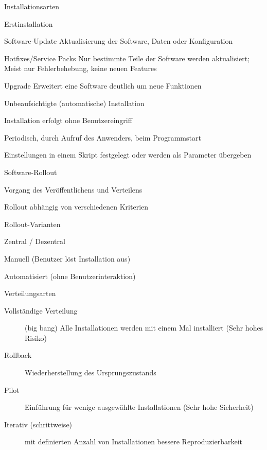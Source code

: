 \documentclass[a4paper]{article}
\begin{document}
\begin{multicols}{3}
  Installationsarten
  \begin{description*}
    \item[Erstinstallation]
    \item[Software-Update] Aktualisierung der Software, Daten oder Konfiguration
    \item[Hotfixes/Service Packs] Nur bestimmte Teile der Software werden aktualisiert; Meist nur Fehlerbehebung, keine neuen Features
    \item[Upgrade] Erweitert eine Software deutlich um neue Funktionen
    \item[Unbeaufsichtigte (automatische)] Installation
    \begin{itemize*}
      \item Installation erfolgt ohne Benutzereingriff
      \item Periodisch, durch Aufruf des Anwenders, beim Programmstart
      \item Einstellungen in einem Skript festgelegt oder werden als Parameter übergeben
    \end{itemize*}
  \end{description*}

  Software-Rollout
  \begin{itemize*}
    \item Vorgang des Veröffentlichens und Verteilens
    \item Rollout abhängig von verschiedenen Kriterien
    \item Rollout-Varianten
    \begin{itemize*}
      \item Zentral / Dezentral
      \item Manuell (Benutzer löst Installation aus)
      \item Automatisiert (ohne Benutzerinteraktion)
    \end{itemize*}
    \item Verteilungsarten
    \begin{description}
      \item[Vollständige Verteilung] (big bang) Alle Installationen werden mit einem Mal installiert (Sehr hohes Risiko)
      \item[Rollback] Wiederherstellung des Ursprungszustands
      \item[Pilot] Einführung für wenige ausgewählte Installationen (Sehr hohe Sicherheit)
      \item[Iterativ (schrittweise)] mit definierten Anzahl von Installationen bessere Reproduzierbarkeit
    \end{description}
  \end{itemize*}


\end{multicols}
\end{document}
